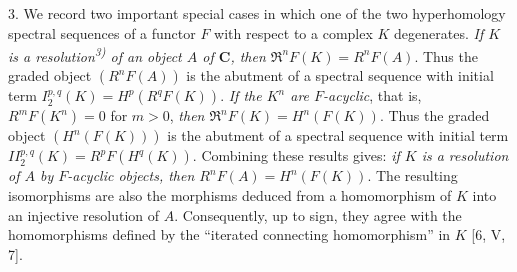 3. We record two important special cases in which one of the two
hyperhomology spectral sequences of a functor $F$ with respect to a complex
$K$ degenerates. \textit{If $K$ is a resolution\textsuperscript{\textup{3)}} of an
object $A$ of $\mathbf{C}$, then $\mathfrak R^nF(K)=R^nF(A)$}. Thus the graded object
$(R^nF(A))$ is the abutment of a spectral sequence with initial term
$I_2^{p,q}(K)=H^p(R^qF(K))$. \textit{If the $K^n$ are
$F$-acyclic}, that is, $R^mF(K^n)=0$ for $m>0$, \textit{then
$\mathfrak R^nF(K)=H^n(F(K))$}. Thus the graded object $(H^n(F(K)))$ is the
abutment of a spectral sequence with initial term
$II_2^{p,q}(K)=R^pF(H^q(K))$. Combining these results gives:
\textit{if $K$ is a resolution of $A$ by $F$-acyclic objects, then
$R^nF(A)=H^n(F(K))$}. The resulting isomorphisms are also the morphisms
deduced from a homomorphism of $K$ into an injective resolution of $A$.
Consequently, up to sign, they agree with the homomorphisms defined by the
``iterated connecting homomorphism'' in $K$ [6, V, 7].

